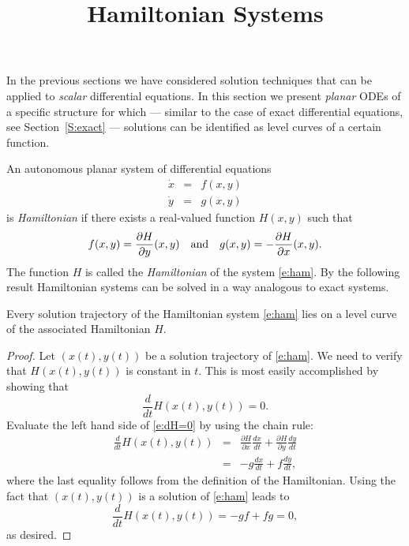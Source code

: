 \documentclass{ximera}
\title{Hamiltonian Systems}
\begin{document}
\begin{abstract}
\end{abstract}
\maketitle


\label{sec:HamSys}

In the previous sections we have considered solution techniques that
can be applied to {\em scalar\/} differential equations.  In this section 
we present {\em planar\/} ODEs of a specific structure for which 
--- similar to the case of exact differential equations, see 
Section~\ref{S:exact} --- solutions
can be identified as level curves of a certain function.

An autonomous planar system of differential equations 
\begin{equation}  \label{e:ham}
\begin{array}{rcl} 
\dot{x} & = & f(x,y) \\
\dot{y} & = & g(x,y) 
\end{array}
\end{equation}
is {\em Hamiltonian\/} if there exists a real-valued
function $H(x,y)$ such that 
\[
f(x,y) = \frac{\partial H}{\partial y}(x,y) \quad\mbox{and}\quad 
g(x,y) =-\frac{\partial H}{\partial x}(x,y).
\]
The function $H$ is called the {\em Hamiltonian\/}
of the system \eqref{e:ham}.
By the following result Hamiltonian systems can be solved in a way analogous 
to exact systems.

\begin{theorem}
Every solution trajectory of the Hamiltonian system \eqref{e:ham} lies
on a level curve of the associated Hamiltonian $H$.
\end{theorem}

\begin{proof} 
Let $(x(t),y(t))$ be a solution trajectory of \eqref{e:ham}.  We need to 
verify that $H(x(t),y(t))$ is constant in $t$.  This is most easily 
accomplished by showing that 
\begin{equation} \label{e:dH=0}
\frac{d}{dt} H(x(t),y(t)) = 0.
\end{equation}
Evaluate the left hand side of \eqref{e:dH=0} by using the chain rule:
\begin{eqnarray*}
\frac{d}{dt} H(x(t),y(t)) & = & \frac{\partial H}{\partial x}\frac{dx}{dt}
+ \frac{\partial H}{\partial y} \frac{dy}{dt} \\
& = & -g\frac{dx}{dt} + f\frac{dy}{dt}, 
\end{eqnarray*}
where the last equality follows from the definition of the Hamiltonian.  
Using the fact that $(x(t),y(t))$ is a solution of \eqref{e:ham} leads to 
\[
 \frac{d}{dt} H(x(t),y(t)) = -gf+fg = 0,
\]
as desired.  \end{proof}
\end{document}
